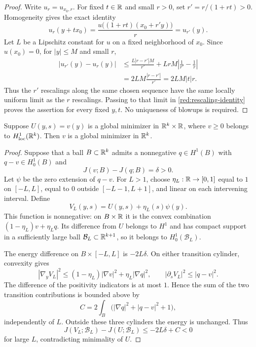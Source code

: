 \begin{proof}
Write $u_r=u_{x_0,r}$.  For fixed $t\in\mathbb R$ and small $r>0$, set
$r'=r/(1+rt)>0$.  Homogeneity gives the exact identity
\begin{equation}\label{red:rescaling-identity}
 u_r(y+t x_0)
 =\frac{u\bigl((1+rt)(x_0+r'y)\bigr)}r
 =u_{r'}(y).
\end{equation}
Let $L$ be a Lipschitz constant for $u$ on a fixed neighborhood of $x_0$.
Since $u(x_0)=0$, for $|y|\leq M$ and small $r$,
\begin{align*}
 |u_{r'}(y)-u_r(y)|
 &\leq\frac{L|r-r'|M}{r'}
       +LrM\left|\frac1{r'}-\frac1r\right|\\
 &=2LM\frac{|r-r'|}{r'}=2LM|t|r.
\end{align*}
Thus the $r'$ rescalings along the same chosen sequence have the same
locally uniform limit as the $r$ rescalings.  Passing to that limit in
\eqref{red:rescaling-identity} proves the assertion for every fixed $y,t$.
No uniqueness of blowups is required.
\end{proof}

\begin{lemma}\label{red:factor-minimality}
Suppose $U(y,s)=v(y)$ is a global minimizer in
$\mathbb R^k\times\mathbb R$, where $v\geq0$ belongs to $H^1_{\mathrm{loc}}(\mathbb R^k)$.
Then $v$ is a global minimizer in $\mathbb R^k$.
\end{lemma}

\begin{proof}
Suppose that a ball $B\subset\mathbb R^k$ admits a nonnegative
$q\in H^1(B)$ with $q-v\in H^1_0(B)$ and
\[
 J(v;B)-J(q;B)=\delta>0.
\]
Let $\psi$ be the zero extension of $q-v$.  For $L>1$, choose
$\eta_L:\mathbb R\to[0,1]$ equal to $1$ on $[-L,L]$, equal to $0$ outside
$[-L-1,L+1]$, and linear on each intervening interval.  Define
\[
 V_L(y,s)=U(y,s)+\eta_L(s)\psi(y).
\]
This function is nonnegative: on $B\times\mathbb R$ it is the convex combination
$(1-\eta_L)v+\eta_Lq$.  Its difference from $U$ belongs to $H^1$ and has
compact support in a sufficiently large ball $\mathcal B_L\subset\mathbb R^{k+1}$,
so it belongs to $H^1_0(\mathcal B_L)$.

The energy difference on $B\times[-L,L]$ is $-2L\delta$.  On either
transition cylinder, convexity gives
\[
 |\nabla_y V_L|^2\leq(1-\eta_L)|\nabla v|^2+\eta_L|\nabla q|^2,
 \qquad |\partial_sV_L|^2\leq|q-v|^2.
\]
The difference of the positivity indicators is at most $1$.  Hence the
sum of the two transition contributions is bounded above by
\[
 C=2\int_B\bigl(|\nabla q|^2+|q-v|^2+1\bigr),
\]
independently of $L$.  Outside these three cylinders the energy is unchanged.
Thus
\[
 J(V_L;\mathcal B_L)-J(U;\mathcal B_L)\leq-2L\delta+C<0
\]
for large $L$, contradicting minimality of $U$.
\end{proof}

